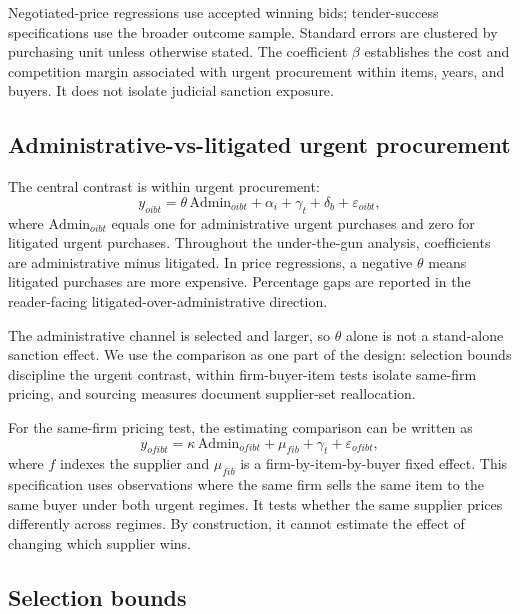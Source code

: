 Negotiated-price regressions use accepted winning bids; tender-success specifications use the broader outcome sample. Standard errors are clustered by purchasing unit unless otherwise stated. The coefficient $\beta$ establishes the cost and competition margin associated with urgent procurement within items, years, and buyers. It does not isolate judicial sanction exposure.

\subsection{Administrative-vs-litigated urgent procurement}
\label{subsec:utg}

The central contrast is within urgent procurement:
\begin{equation}
y_{oibt}=\theta\,\text{Admin}_{oibt}+\alpha_i+\gamma_t+\delta_b+\varepsilon_{oibt},
\label{eq:utg}
\end{equation}
where $\text{Admin}_{oibt}$ equals one for administrative urgent purchases and zero for litigated urgent purchases. Throughout the under-the-gun analysis, coefficients are administrative minus litigated. In price regressions, a negative $\theta$ means litigated purchases are more expensive. Percentage gaps are reported in the reader-facing litigated-over-administrative direction.

The administrative channel is selected and larger, so $\theta$ alone is not a stand-alone sanction effect. We use the comparison as one part of the design: selection bounds discipline the urgent contrast, within firm-buyer-item tests isolate same-firm pricing, and sourcing measures document supplier-set reallocation.

For the same-firm pricing test, the estimating comparison can be written as
\begin{equation}
y_{ofibt}=\kappa\,\text{Admin}_{ofibt}+\mu_{fib}+\gamma_t+\varepsilon_{ofibt},
\label{eq:triple}
\end{equation}
where $f$ indexes the supplier and $\mu_{fib}$ is a firm-by-item-by-buyer fixed effect. This specification uses observations where the same firm sells the same item to the same buyer under both urgent regimes. It tests whether the same supplier prices differently across regimes. By construction, it cannot estimate the effect of changing which supplier wins.

\subsection{Selection bounds}
\label{subsec:bounds}

